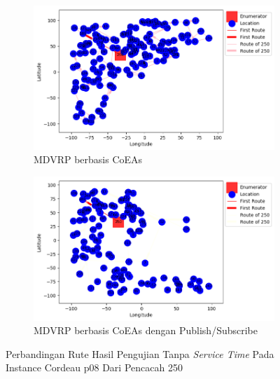 \begin{figure}[H]
	\centering
	\begin{subfigure}[t]{\textwidth}
		\centering
		\includegraphics[width=\textwidth]{Resources/Images/cordeau_p08/cordeau_p08_notw_250_coes}
		\caption{MDVRP berbasis CoEAs}
		\label{fig:cordeau_p08_notw_250_coes}
	\end{subfigure}
	\begin{subfigure}[t]{\textwidth}
		\centering
		\includegraphics[width=\textwidth]{Resources/Images/cordeau_p08/cordeau_p08_notw_250_pubsub_coes}
		\caption{MDVRP berbasis CoEAs dengan Publish/Subscribe}
		\label{fig:cordeau_p08_notw_250_pubsub_coes}
	\end{subfigure}
	\caption{Perbandingan Rute Hasil Pengujian Tanpa \textit{Service Time} Pada Instance Cordeau p08 Dari Pencacah 250}
	\label{fig:cordeau_p08_notw_250}
\end{figure}


